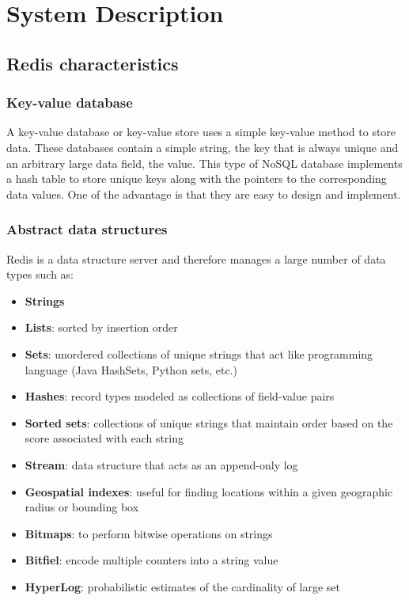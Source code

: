 \documentclass[runningheads]{llncs}
\begin{document}
\newpage
\section{System Description}
\subsection{Redis characteristics}

\subsubsection{Key-value database}
A key-value database or key-value store uses a simple key-value method to store data. These databases contain a simple string, the key that is always unique and an arbitrary large data field, the value. 
This type of NoSQL database implements a hash table to store unique keys along with the pointers to the corresponding data values. One of the advantage is that they are easy to design and implement.

\subsubsection{Abstract data structures}
Redis is a data structure server and therefore manages a large number of data types such as:
\begin{itemize}
    \item \textbf{Strings}
    \item \textbf{Lists}: sorted by insertion order
    \item \textbf{Sets}: unordered collections of unique strings that act like programming language (Java HashSets, Python sets, etc.)
    \item \textbf{Hashes}: record types modeled as collections of field-value pairs
    \item \textbf{Sorted sets}: collections of unique strings that maintain order based on the score associated with each string
    \item \textbf{Stream}: data structure that acts as an append-only log
    \item \textbf{Geospatial indexes}: useful for finding locations within a given geographic radius or bounding box
    \item \textbf{Bitmaps}: to perform bitwise operations on strings
    \item \textbf{Bitfiel}: encode multiple counters into a string value
    \item \textbf{HyperLog}: probabilistic estimates of the cardinality of large set
\end{itemize}
\end{document}

